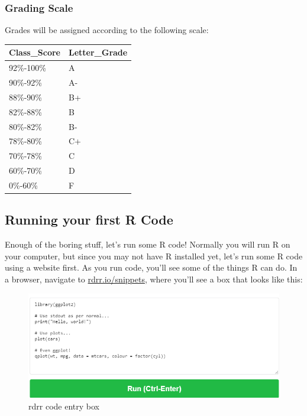 \documentclass[
]{article}
\begin{document}
\hypertarget{grading-scale}{%
\subsubsection{Grading Scale}\label{grading-scale}}

Grades will be assigned according to the following scale:

\begin{table}[H]
\centering
\begin{tabular}{l|l}
\hline
Class\_Score & Letter\_Grade\\
\hline
92\%-100\% & A\\
\hline
90\%-92\% & A-\\
\hline
88\%-90\% & B+\\
\hline
82\%-88\% & B\\
\hline
80\%-82\% & B-\\
\hline
78\%-80\% & C+\\
\hline
70\%-78\% & C\\
\hline
60\%-70\% & D\\
\hline
0\%-60\% & F\\
\hline
\end{tabular}
\end{table}

\hypertarget{running-your-first-r-code}{%
\subsection{Running your first R Code}\label{running-your-first-r-code}}

Enough of the boring stuff, let's run some R code!
Normally you will run R on your computer, but since you may not have R installed yet, let's run some R code using a website first.
As you run code, you'll see some of the things R can do.
In a browser, navigate to \href{https://rdrr.io/snippets/}{rdrr.io/snippets}, where you'll see a box that looks like this:

\begin{figure}

{\centering \includegraphics{src/images/rdrr} 

}

\caption{rdrr code entry box}\label{fig:unnamed-chunk-10}
\end{figure}
\end{document}
